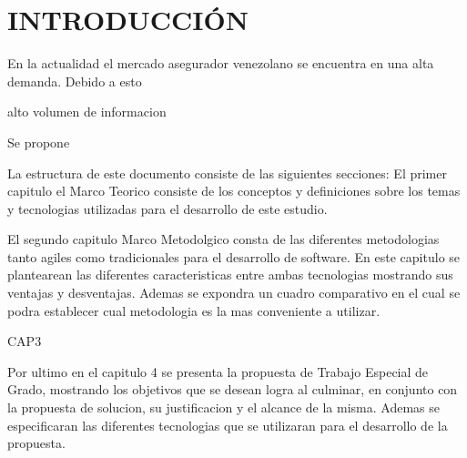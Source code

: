 \chapter*{INTRODUCCIÓN}


\setlength{\parskip}{5mm}
En la actualidad el mercado asegurador venezolano se encuentra en una alta demanda. Debido a esto 

alto volumen de informacion


Se propone


La estructura de este documento consiste de las siguientes secciones: El primer capitulo el Marco Teorico consiste de los conceptos y definiciones sobre los temas y tecnologias utilizadas para el desarrollo de este estudio. 

El segundo capitulo Marco Metodolgico consta de las diferentes metodologias tanto agiles como tradicionales para el desarrollo de software. En este capitulo se plantearean las diferentes caracteristicas entre ambas tecnologias mostrando sus ventajas y desventajas. Ademas se expondra un cuadro comparativo en el cual se podra establecer cual metodologia es la mas conveniente a utilizar.


CAP3

Por ultimo en el capitulo 4 se presenta la propuesta de Trabajo Especial de Grado, mostrando los objetivos que se desean logra al culminar, en conjunto con la propuesta de solucion, su justificacion y el alcance de la misma. Ademas se especificaran las diferentes tecnologias que se utilizaran para el desarrollo de la propuesta.
\setlength{\parskip}{0mm}